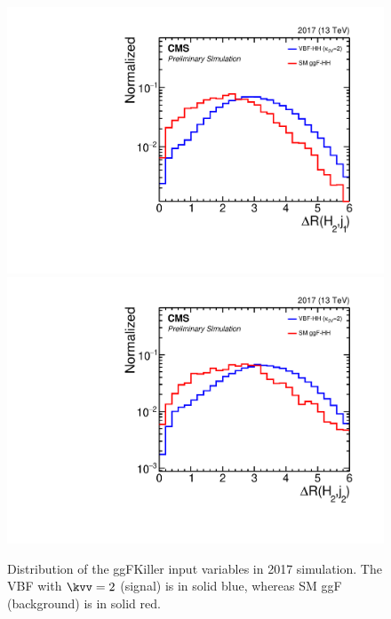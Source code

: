 \begin{figure}[htbp!]
\begin{center}
\includegraphics[width=0.27\linewidth]{Figures/AnalysisStrategy/eventselection/ggfkiller/2017ggfkiller/plot_2017_h_h2j1_deltaR.pdf}
\includegraphics[width=0.27\linewidth]{Figures/AnalysisStrategy/eventselection/ggfkiller/2017ggfkiller/plot_2017_h_h2j2_deltaR.pdf}
\end{center}
\caption[Distribution of the ggFKiller input  variables in 2017 simulation]{Distribution of the ggFKiller input  variables in 2017 simulation. The VBF with $\kvv=2$ (signal) is in solid blue, whereas SM ggF (background) is in solid red.}
\label{event_selection:fig:bdtvariables2017}
\end{figure}

